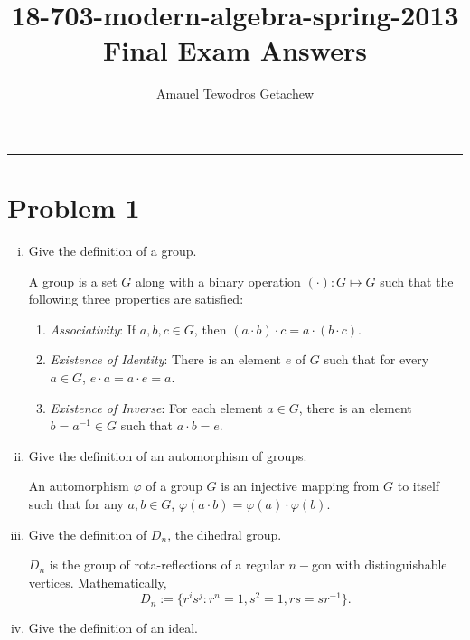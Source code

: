 \documentclass[12pt]{article}
\title{18-703-modern-algebra-spring-2013 Final Exam Answers}
\author{Amauel Tewodros Getachew}
\begin{document}
  \maketitle
  \begin{center}

  \vspace{-0.3in}

  \end{center}


  \noindent
  \rule{\linewidth}{0.4pt}
  
  \section*{Problem 1}

  \begin{enumerate}[(i)]
    \item Give the definition of a group.  
    
    \noindent A group is a set $G$ along with a binary operation $(\cdot) : G \mapsto G$ such that the following three properties are satisfied:
    \begin{enumerate}
        \item \textit{Associativity}: If $a, b, c \in G$, then $(a \cdot b)\cdot c = a \cdot (b \cdot c)$.
        \item \textit{Existence of Identity}: There is an element $e$ of $G$ such that for every $a \in G$, $e \cdot a = a \cdot e =  a.$
        \item \textit{Existence of Inverse}: For each element $a \in G$, there is an element $b = a^{-1} \in G$ such that $a \cdot b = e$.
    \end{enumerate}

    \item Give the definition of an automorphism of groups. 
    
    \noindent An automorphism $\varphi$ of a group $G$ is an injective mapping from $G$ to itself such that for any $a, b \in G$, $\varphi(a \cdot b) = \varphi(a) \cdot\varphi(b).$

    \item Give the definition of $D_n$, the dihedral group. 

    \noindent $D_n$ is the group of rota-reflections of a regular $n-$gon with distinguishable vertices. Mathematically, 
    $$D_n := \{r^is^j : r^n = 1, s^2 = 1, rs = sr^{-1}\}.$$

    \item Give the definition of an ideal. 


\end{enumerate}
\end{document}
